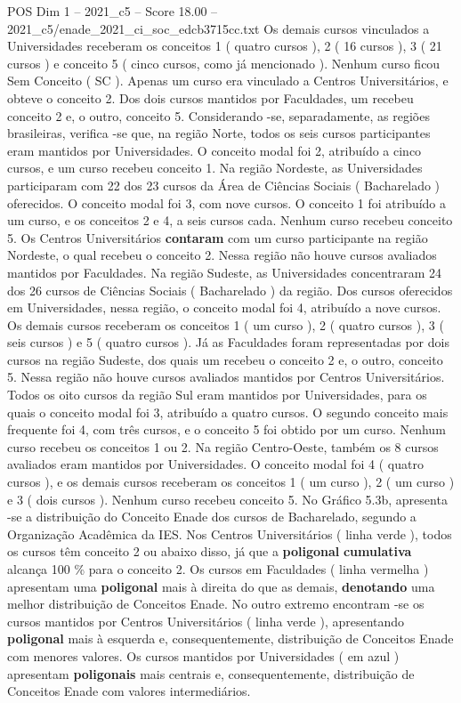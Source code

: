 \begin{textsample}{POS Dim 1 – 2021\_c5 – Score 18.00 – 2021\_c5/enade\_2021\_ci\_soc\_edcb3715cc.txt}
Os demais cursos vinculados a Universidades receberam os conceitos 1 ( quatro cursos ), 2 ( 16 cursos ), 3 ( 21 cursos ) e conceito 5 ( cinco cursos, como já mencionado ).
Nenhum curso ficou Sem Conceito ( SC ).
Apenas um curso era vinculado a Centros Universitários, e obteve o conceito 2.
Dos dois cursos mantidos por Faculdades, um recebeu conceito 2 e, o outro, conceito 5.
Considerando -se, separadamente, as regiões brasileiras, verifica -se que, na região Norte, todos os seis cursos participantes eram mantidos por Universidades.
O conceito modal foi 2, atribuído a cinco cursos, e um curso recebeu conceito 1.
Na região Nordeste, as Universidades participaram com 22 dos 23 cursos da Área de Ciências Sociais ( Bacharelado ) oferecidos.
O conceito modal foi 3, com nove cursos.
O conceito 1 foi atribuído a um curso, e os conceitos 2 e 4, a seis cursos cada.
Nenhum curso recebeu conceito 5.
Os Centros Universitários \textbf{contaram} com um curso participante na região Nordeste, o qual recebeu o conceito 2.
Nessa região não houve cursos avaliados mantidos por Faculdades.
Na região Sudeste, as Universidades concentraram 24 dos 26 cursos de Ciências Sociais ( Bacharelado ) da região.
Dos cursos oferecidos em Universidades, nessa região, o conceito modal foi 4, atribuído a nove cursos.
Os demais cursos receberam os conceitos 1 ( um curso ), 2 ( quatro cursos ), 3 ( seis cursos ) e 5 ( quatro cursos ).
Já as Faculdades foram representadas por dois cursos na região Sudeste, dos quais um recebeu o conceito 2 e, o outro, conceito 5.
Nessa região não houve cursos avaliados mantidos por Centros Universitários.
Todos os oito cursos da região Sul eram mantidos por Universidades, para os quais o conceito modal foi 3, atribuído a quatro cursos.
O segundo conceito mais frequente foi 4, com três cursos, e o conceito 5 foi obtido por um curso.
Nenhum curso recebeu os conceitos 1 ou 2.
Na região Centro-Oeste, também os 8 cursos avaliados eram mantidos por Universidades.
O conceito modal foi 4 ( quatro cursos ), e os demais cursos receberam os conceitos 1 ( um curso ), 2 ( um curso ) e 3 ( dois cursos ).
Nenhum curso recebeu conceito 5.
No Gráfico 5.3b, apresenta -se a distribuição do Conceito Enade dos cursos de Bacharelado, segundo a Organização Acadêmica da IES.
Nos Centros Universitários ( linha verde ), todos os cursos têm conceito 2 ou abaixo disso, já que a \textbf{poligonal} \textbf{cumulativa} alcança 100 \% para o conceito 2.
Os cursos em Faculdades ( linha vermelha ) apresentam uma \textbf{poligonal} mais à direita do que as demais, \textbf{denotando} uma melhor distribuição de Conceitos Enade.
No outro extremo encontram -se os cursos mantidos por Centros Universitários ( linha verde ), apresentando \textbf{poligonal} mais à esquerda e, consequentemente, distribuição de Conceitos Enade com menores valores.
Os cursos mantidos por Universidades ( em azul ) apresentam \textbf{poligonais} mais centrais e, consequentemente, distribuição de Conceitos Enade com valores intermediários.

\end{textsample}
